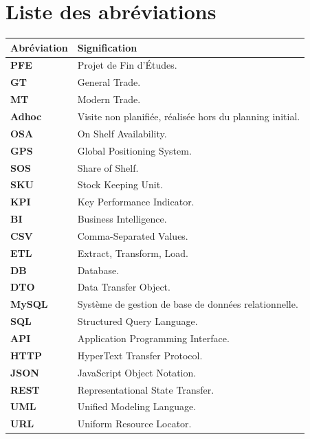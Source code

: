 \chapter*{Liste des abréviations}

\vspace{0.5cm}

\begin{center}
\begin{minipage}{0.82\textwidth}

\renewcommand{\arraystretch}{1.25}
\setlength{\tabcolsep}{6pt}

\begin{tabularx}{\textwidth}{>{\bfseries}p{2.6cm} X}
\toprule
\textbf{Abréviation} & \textbf{Signification} \\
\midrule
PFE & Projet de Fin d’Études. \\
GT & General Trade. \\
MT & Modern Trade. \\
Adhoc & Visite non planifiée, réalisée hors du planning initial. \\
OSA & On Shelf Availability. \\
GPS & Global Positioning System. \\
SOS & Share of Shelf. \\
SKU & Stock Keeping Unit. \\
KPI & Key Performance Indicator. \\
BI & Business Intelligence. \\
CSV & Comma-Separated Values. \\
ETL & Extract, Transform, Load. \\
DB & Database. \\
DTO & Data Transfer Object. \\
MySQL & Système de gestion de base de données relationnelle. \\
SQL & Structured Query Language. \\
API & Application Programming Interface. \\
HTTP & HyperText Transfer Protocol. \\
JSON & JavaScript Object Notation. \\
REST & Representational State Transfer. \\
UML & Unified Modeling Language. \\
URL & Uniform Resource Locator. \\
\bottomrule
\end{tabularx}

\end{minipage}
\end{center}